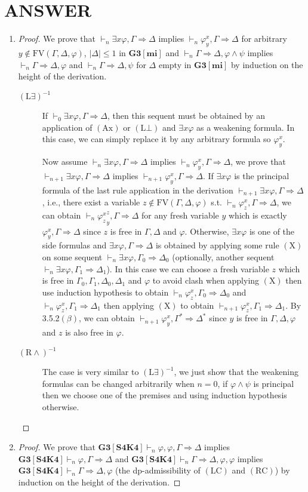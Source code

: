 \documentclass[12pt]{article}
\newcommand\A{\varphi}
\newcommand\B{\psi}
\newcommand\GG\Gamma
\newcommand\D\Delta
\newcommand\TO\Rightarrow
\newcommand\PC[1]{\mathbf{#1}}
\newcommand\FV[1]{\mathrm{FV}({#1})}
\newcommand\AX{\textrm{Ax}}
\newcommand\LB{\textrm{L$\bot$}}
\newcommand\LC{\textrm{LC}}
\newcommand\RC{\textrm{RC}}
\newcommand\RA{\textrm{R$\land$}}
\newcommand\LX{\textrm{L$\exists$}}
\begin{document}
\section{ANSWER}
\begin{enumerate}
    \item \begin{proof}
        We prove that $\vdash_n\exists x\A,\GG\TO\D$ implies $\vdash_n\A^x_y,\GG\TO\D$ for arbitrary $y\notin\FV{\GG,\D,\A}$, $|\D|\le1$ in $\PC{G3[mi]}$ and $\vdash_n\GG\TO\D,\A\land\B$ implies $\vdash_n\GG\TO\D,\A$ and $\vdash_n\GG\TO\D,\B$ for $\D$ empty in $\PC{G3[mi]}$ by induction on the height of the derivation.
        \begin{description}
            \item[$(\LX)^{-1}$] If $\vdash_0\exists x\A,\GG\TO\D$, then this sequent must be obtained by an application of $(\AX)$ or $(\LB)$ and $\exists x\A$ as a weakening formula. In this case, we can simply replace it by any arbitrary formula so $\A^x_y$.
            
            Now assume $\vdash_n\exists x\A,\GG\TO\D$ implies $\vdash_n\A^x_y,\GG\TO\D$, we prove that $\vdash_{n+1}\exists x\A,\GG\TO\D$ implies $\vdash_{n+1}\A^x_y,\GG\TO\D$. If $\exists x\A$ is the principal formula of the last rule application in the derivation $\vdash_{n+1}\exists x\A,\GG\TO\D$, i.e., there exist a variable $z\notin\FV{\GG,\D,\A}$ s.t. $\vdash_n\A^x_z,\GG\TO\D$, we can obtain $\vdash_n{\A^x_z}^z_y,\GG\TO\D$ for any fresh variable $y$ which is exactly $\A^x_y,\GG\TO\D$ since $z$ is free in $\GG,\D$ and $\A$. Otherwise, $\exists x\A$ is one of the side formulas and $\exists x\A,\GG\TO\D$ is obtained by applying some rule $\mathrm{(X)}$ on some sequent $\vdash_n\exists x\A,\GG_0\TO\D_0$ (optionally, another sequent $\vdash_n\exists x\A,\GG_1\TO\D_1$). In this case we can choose a fresh variable $z$ which is free in $\GG_0,\GG_1,\D_0,\D_1$ and $\A$ to avoid clash when applying $\mathrm{(X)}$ then use induction hypothesis to obtain $\vdash_n\A^x_z,\GG_0\TO\D_0$ and $\vdash_n\A^x_z,\GG_1\TO\D_1$ then applying $\mathrm{(X)}$ to obtain $\vdash_{n+1}\A^x_z,\GG_1\TO\D_1$. By 3.5.2$(\beta)$, we can obtain $\vdash_{n+1}\A^x_y,\GG^*\TO\D^*$ since $y$ is free in $\GG,\D,\A$ and $z$ is also free in $\A$.
            
            \item[$(\RA)^{-1}$] The case is very similar to $(\LX)^{-1}$, we just show that the weakening formulas can be changed arbitrarily when $n=0$, if $\A\land\B$ is principal then we choose one of the premises and using induction hypothesis otherwise.
        \end{description}
    \end{proof}
    \item \begin{proof}
            We prove that $\PC{G3[S4K4]}\vdash_n\A,\A,\GG\TO\D$ implies $\PC{G3[S4K4]}\vdash_n\A,\GG\TO\D$ and $\PC{G3[S4K4]}\vdash_n\GG\TO\D,\A,\A$ implies $\PC{G3[S4K4]}\vdash_n\GG\TO\D,\A$ (the dp-admissibility of $(\LC)$ and $(\RC)$) by induction on the height of the derivation.
            

\end{proof}
\end{enumerate}
\end{document}
